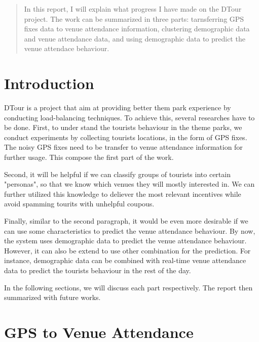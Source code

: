 \documentclass[12pt]{article}
\begin{document}
\maketitle

\begin{abstract}

In this report, I will explain what progress I have made on the DTour project. The work can be summarized in three parts: tarnsferring GPS fixes data to venue attendance information, clustering demographic data and venue attendance data, and using demographic data to predict the venue attendace behaviour.
\end{abstract}

\section{Introduction}

DTour is a project that aim at providing better them park experience by conducting load-balancing techniques. To achieve this, several researches have to be done. First, to under stand the tourists behaviour in the theme parks, we conduct experiments by collecting tourists locations, in the form of GPS fixes. The noisy GPS fixes need to be transfer to venue attendance information for further usage. This compose the first part of the work.

Second, it will be helpful if we can classify groups of tourists into certain "personas", so that we know which venues they will mostly interested in. We can further utilized this knowledge to deliever the most relevant incentives while avoid spamming tourits with unhelpful coupous.

Finally, similar to the second paragraph, it would be even more desirable if we can use some characteristics to predict the venue attendance behaviour. By now, the system uses demographic data to predict the venue attendance behaviour. However, it can also be extend to use other combination for the prediction. For instance, demographic data can be combined with real-time venue attendance data to predict the tourists behaviour in the rest of the day.

In the following sections, we will discuss each part respectively. The report then summarized with future works.

\section{GPS to Venue Attendance}\label{gps_venue}
\end{document}
